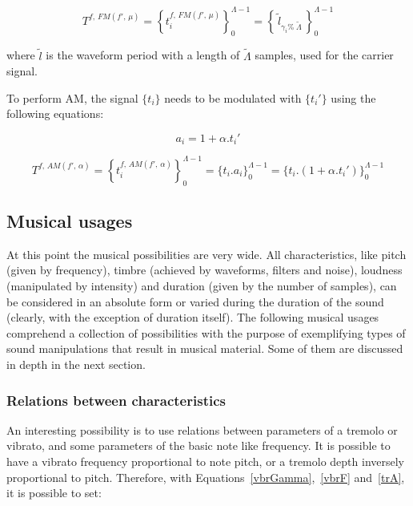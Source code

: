 \begin{equation}\label{fmT}
T^{f,\, FM(f',\,\mu)}=\left\{ t_i^{f,\,FM(f',\,\mu)} \right\}_0^{\Lambda-1}=\left\{\,\widetilde{l}_{\gamma_i \%\; \widetilde{\Lambda} } \,\right\}_0^{\Lambda-1}
\end{equation}


\noindent where $\widetilde{l}$ is the waveform period with a length of $\widetilde{\Lambda}$ samples, used for the carrier signal.

To perform AM, the signal $\{t_i\}$ needs to be modulated with $\{t_i'\}$ using the following equations:

\begin{equation}\label{amA}
a_i=1 + \alpha . t_i'
\end{equation}

\begin{equation}\label{amT}
T^{f,\,AM(f',\,\alpha)}=\left\{ t_i^{f,\,AM(f',\,\alpha)} \right\}_0^{\Lambda-1}=\{ t_i . a_i \}_0^{\Lambda-1}= \{t_i . (1 + \alpha . t_i')    \}_0^{\Lambda-1}
\end{equation}

\subsection{Musical usages}\label{subsec:mus2}
At this point the musical possibilities are very wide. All characteristics, like pitch (given by frequency), timbre (achieved by waveforms, filters and noise), loudness (manipulated by intensity) and duration (given by the number of samples), can be considered in an absolute form or varied during the duration of the sound (clearly, with the exception of duration itself). The following musical usages comprehend a collection of possibilities with the purpose of exemplifying types of sound manipulations that result in musical material. Some of them are discussed in depth in the next section.

\subsubsection{Relations between characteristics}
An interesting possibility is to use relations between parameters of
a tremolo or vibrato, and some parameters of the basic note like frequency. It is possible to have a vibrato frequency proportional
to note pitch, or a tremolo depth inversely proportional to
pitch. Therefore, with Equations~\ref{vbrGamma},~\ref{vbrF} and~\ref{trA}, it is possible to set:

